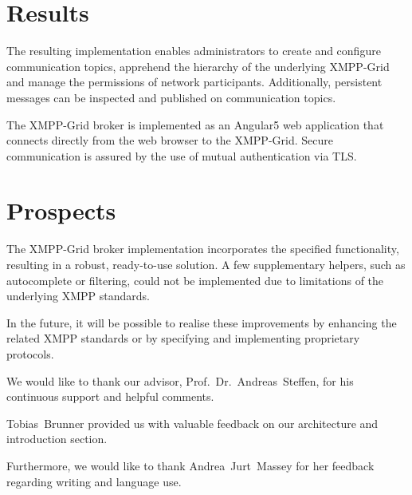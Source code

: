 \section*{Results}

The resulting implementation enables administrators to create and configure communication topics, apprehend the hierarchy of the underlying XMPP-Grid and manage the permissions of network participants.
Additionally, persistent messages can be inspected and published on communication topics.

The XMPP-Grid broker is implemented as an Angular5 web application that connects directly from the web browser to the XMPP-Grid. Secure communication is assured by the use of mutual authentication via TLS.

\section*{Prospects}

The XMPP-Grid broker implementation incorporates the specified functionality, resulting in a robust, ready-to-use solution.
A few supplementary helpers, such as autocomplete or filtering, could not be implemented due to limitations of the underlying XMPP standards.

In the future, it will be possible to realise these improvements by enhancing the related XMPP standards or by specifying and implementing proprietary protocols.


\begin{acknowledgements}
\addchaptertocentry{\acknowledgementname} %
We would like to thank our advisor, Prof.~Dr.~Andreas~Steffen, for his continuous support and helpful comments.

Tobias~Brunner provided us with valuable feedback on our architecture and introduction section.

Furthermore, we would like to thank Andrea~Jurt~Massey for her feedback regarding writing and language use.
\end{acknowledgements}



